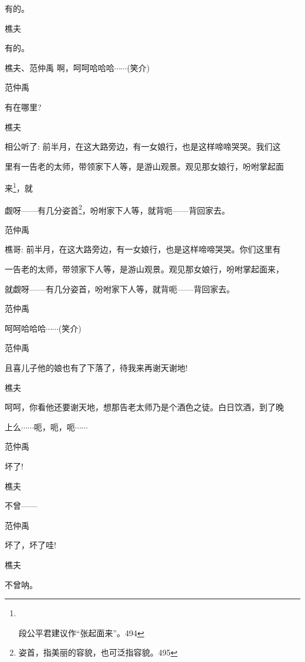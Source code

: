 有的。

樵夫\hspace{30pt}~

有的。

樵夫、范仲禹 啊，呵呵哈哈哈$\cdots{}\cdots{}$(笑介)

范仲禹\hspace{20pt}~

有在哪里?

樵夫

相公听了: 前半月，在这大路旁边，有一女娘行，也是这样啼啼哭哭。我们这

里有一告老的太师，带领家下人等，是游山观景。观见那女娘行，吩咐掌起面

来\footnote{\hspace{10pt}~

段公平君建议作``张起面来''。{494}}，就

觑呀------有几分姿首\footnote{ 姿首，指美丽的容貌，也可泛指容貌。{495}}，吩咐家下人等，就背呃------背回家去。

范仲禹

樵哥: 前半月，在这大路旁边，有一女娘行，也是这样啼啼哭哭。你们这里有

一告老的太师，带领家下人等，是游山观景。观见那女娘行，吩咐掌起面来，

就觑呀------有几分姿首，吩咐家下人等，就背呃------背回家去。

范仲禹\hspace{20pt}~

呵呵哈哈哈$\cdots{}\cdots{}$(笑介)

范仲禹\hspace{20pt}~

且喜儿子他的娘也有了下落了，待我来再谢天谢地!

樵夫

呵呵，你看他还要谢天地，想那告老太师乃是个酒色之徒。白日饮酒，到了晚

上么$\cdots{}\cdots{}$呃，呃，呃$\cdots{}\cdots{}$

范仲禹\hspace{20pt}~

坏了!

樵夫\hspace{30pt}~

不曾------

范仲禹\hspace{20pt}~

坏了，坏了哇!

樵夫\hspace{30pt}~

不曾呐。

